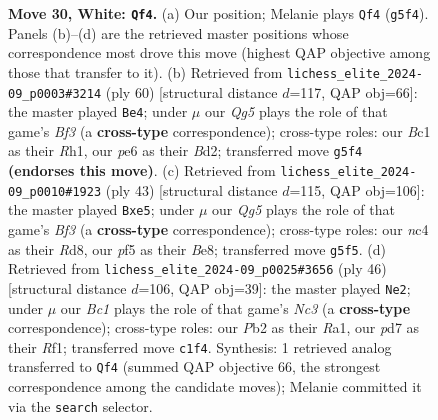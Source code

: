 \documentclass[11pt]{article}
\begin{document}
\begin{figure}[p]
\caption{\textbf{Move 30, White: \texttt{Qf4}.} (a) Our position; Melanie plays \texttt{Qf4} (\texttt{g5f4}). Panels (b)--(d) are the retrieved master positions whose correspondence most drove this move (highest QAP objective among those that transfer to it). (b) Retrieved from \texttt{lichess\_elite\_2024-09\_p0003\#3214} (ply 60) [structural distance $d$=117, QAP obj=66]: the master played \texttt{Be4}; under $\mu$ our \emph{Qg5} plays the role of that game's \emph{Bf3} (a \textbf{cross-type} correspondence); cross-type roles: our \emph{B}c1 as their \emph{R}h1, our \emph{p}e6 as their \emph{B}d2; transferred move \texttt{g5f4} \textbf{(endorses this move)}. (c) Retrieved from \texttt{lichess\_elite\_2024-09\_p0010\#1923} (ply 43) [structural distance $d$=115, QAP obj=106]: the master played \texttt{Bxe5}; under $\mu$ our \emph{Qg5} plays the role of that game's \emph{Bf3} (a \textbf{cross-type} correspondence); cross-type roles: our \emph{n}c4 as their \emph{R}d8, our \emph{p}f5 as their \emph{B}e8; transferred move \texttt{g5f5}. (d) Retrieved from \texttt{lichess\_elite\_2024-09\_p0025\#3656} (ply 46) [structural distance $d$=106, QAP obj=39]: the master played \texttt{Ne2}; under $\mu$ our \emph{Bc1} plays the role of that game's \emph{Nc3} (a \textbf{cross-type} correspondence); cross-type roles: our \emph{P}b2 as their \emph{R}a1, our \emph{p}d7 as their \emph{R}f1; transferred move \texttt{c1f4}. Synthesis: 1 retrieved analog transferred to \texttt{Qf4} (summed QAP objective 66, the strongest correspondence among the candidate moves); Melanie committed it via the \texttt{search} selector.}
\label{fig:thought-m58}
\end{figure}

\clearpage
\end{document}

